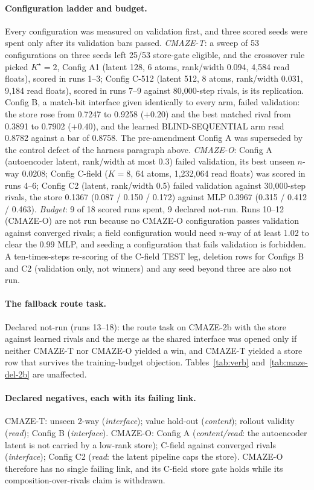 \documentclass{article} %
\newcommand{\Kstar}{\ensuremath{K^{\star}}}
\begin{document}
\paragraph{Configuration ladder and budget.} Every configuration was measured on validation first,
and three scored seeds were spent only after its validation bars passed. \emph{CMAZE-T}: a sweep of
53 configurations on three seeds left 25/53 store-gate eligible, and the crossover rule picked
$\Kstar=2$, Config A1 (latent 128, 6 atoms, rank/width 0.094, 4,584 read floats), scored in runs
1--3; Config C-512 (latent 512, 8 atoms, rank/width 0.031, 9,184 read floats), scored in runs 7--9
against 80,000-step rivals, is its replication. Config B, a match-bit interface given identically to
every arm, failed validation: the store rose from 0.7247 to 0.9258 ($+0.20$) and the best matched
rival from 0.3891 to 0.7902 ($+0.40$), and the learned BLIND-SEQUENTIAL arm read 0.8782 against a bar
of 0.8758. The pre-amendment Config A was superseded by the control defect of the harness paragraph
above. \emph{CMAZE-O}: Config A (autoencoder latent, rank/width at most 0.3) failed validation, its
best unseen $n$-way 0.0208; Config C-field ($K=8$, 64 atoms, 1,232,064 read floats) was scored in
runs 4--6; Config C2 (latent, rank/width 0.5) failed validation against 30,000-step rivals, the store
0.1367 (0.087 / 0.150 / 0.172) against MLP 0.3967 (0.315 / 0.412 / 0.463). \emph{Budget}: 9 of 18
scored runs spent, 9 declared not-run. Runs 10--12 (CMAZE-O) are not run because no CMAZE-O
configuration passes validation against converged rivals; a field configuration would need $n$-way
of at least 1.02 to clear the 0.99 MLP, and seeding a configuration that fails validation is
forbidden. A ten-times-steps re-scoring of the C-field TEST leg, deletion rows for Configs B and C2
(validation only, not winners) and any seed beyond three are also not run.
\paragraph{The fallback route task.} Declared not-run (runs 13--18): the route task on CMAZE-2b %
with the store against learned rivals and the merge as the shared interface was opened only if
neither CMAZE-T nor CMAZE-O yielded a win, and CMAZE-T yielded a store row that survives the
training-budget objection. Tables~\ref{tab:verb} and~\ref{tab:maze-del-2b} are unaffected.
\paragraph{Declared negatives, each with its failing link.} CMAZE-T: unseen 2-way
(\emph{interface}); value hold-out (\emph{content}); rollout validity (\emph{read}); Config B
(\emph{interface}). CMAZE-O: Config A (\emph{content/read}: the autoencoder latent is not carried by
a low-rank store); C-field against converged rivals (\emph{interface}); Config C2 (\emph{read}: the
latent pipeline caps the store). CMAZE-O therefore has no single failing link, and its C-field
store gate holds while its composition-over-rivals claim is withdrawn.
\end{document}
